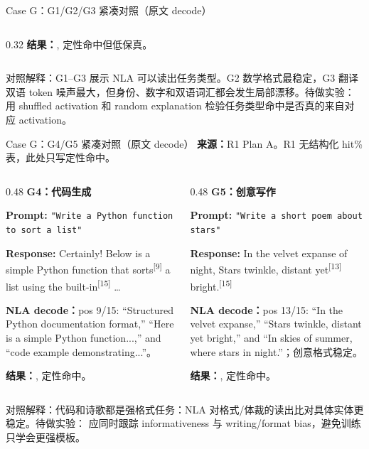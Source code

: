 \begin{frame}{Case G：G1/G2/G3 紧凑对照（原文 decode）}
\begin{columns}[T,onlytextwidth]
\begin{column}{0.32\linewidth}
\vspace{1em}
\textbf{结果：}, 定性命中但低保真。
\end{column}
\end{columns}

\vspace{0.35em}
\alert{对照解释：}G1--G3 展示 NLA 可以读出任务类型。G2 数学格式最稳定，G3 翻译双语 token 噪声最大，但身份、数字和双语词汇都会发生局部漂移。待做实验： 用 shuffled activation 和 random explanation 检验任务类型命中是否真的来自对应 activation。
\end{frame}

\begin{frame}{Case G：G4/G5 紧凑对照（原文 decode）}
\scriptsize
\textbf{来源：}R1 Plan A。R1 无结构化 hit\% 表，此处只写定性命中。

\begin{columns}[T,onlytextwidth]
\begin{column}{0.48\linewidth}
\textbf{G4：代码生成}

\textbf{Prompt:} \texttt{"Write a Python function to sort a list"}

\textbf{Response:} Certainly! Below is a simple Python function that\colorbox{green!15}{ sorts}\textsuperscript{[{9}]} a list using the built\colorbox{green!15}{-in}\textsuperscript{[{15}]} \dots

\vspace{1em}
\textbf{NLA decode：}pos 9/15: ``Structured Python documentation format,'' ``Here is a simple Python function...,'' and ``code example demonstrating...''。

\vspace{1em}
\textbf{结果：}, 定性命中。
\end{column}
\vrule{}\hspace{0.01\linewidth}
\begin{column}{0.48\linewidth}
\textbf{G5：创意写作}

\textbf{Prompt:} \texttt{"Write a short poem about stars"}

\textbf{Response:} In the velvet expanse of night, Stars twinkle, distant\colorbox{green!15}{ yet}\textsuperscript{[{13}]} bright\colorbox{green!15}{.}\textsuperscript{[{15}]}

\vspace{1em}
\textbf{NLA decode：}pos 13/15: ``In the velvet expanse,'' ``Stars twinkle, distant yet bright,'' and ``In skies of summer, where stars in night.''；创意格式稳定。

\vspace{1em}
\textbf{结果：}, 定性命中。
\end{column}
\end{columns}

\vspace{0.35em}
\alert{对照解释：}代码和诗歌都是强格式任务：NLA 对格式/体裁的读出比对具体实体更稳定。待做实验： 应同时跟踪 informativeness 与 writing/format bias，避免训练只学会更强模板。
\end{frame}
